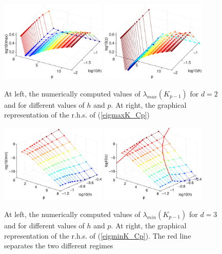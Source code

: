 \documentclass[11pt]{article}
\begin{document}
\begin{figure}
\begin{center}
\includegraphics[width=0.45\textwidth]{Images/igap_eigK2max.eps}\quad
\includegraphics[width=0.45\textwidth]{Images/igap_eigK2smax.eps}\\
\end{center}
\caption{At left, the numerically computed values of
$\lambda_{max}(K_{p-1})$ for $d=2$ and
for different values of $h$ and $p$. At right,
the graphical representation of the r.h.s. of (\ref{eigmaxK_Cp})}
\label{fig:stiffmax-igapd2}
\end{figure}


\begin{figure}
\begin{center}
\includegraphics[width=0.45\textwidth]{Images/igap_eigK3min.eps}\quad
\includegraphics[width=0.45\textwidth]{Images/igap_eigK3smin.eps}\\
\end{center}
\caption{At left, the numerically computed values of
$\lambda_{min}(K_{p-1})$ for $d=3$ and
for different values of $h$ and $p$. At right,
the graphical representation of the r.h.s. of (\ref{eigminK_Cp}). The red line
separates the two different regimes}
\label{fig:stiffmin-igapd3}
\end{figure}
\end{document}
